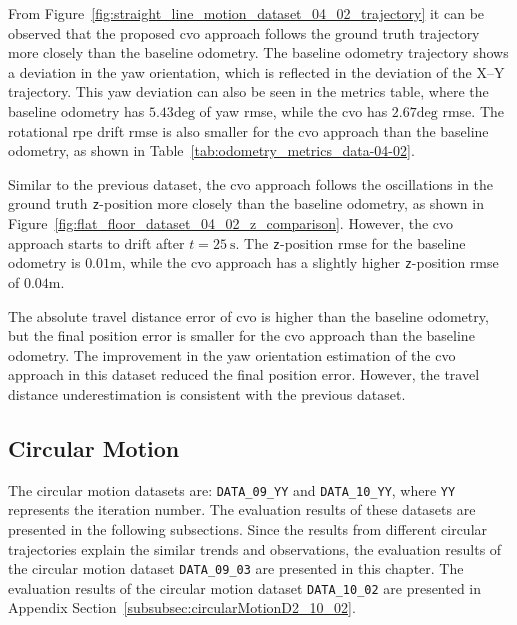 \documentclass[report.tex]{subfiles}
\begin{document}
    From Figure~\ref{fig:straight_line_motion_dataset_04_02_trajectory} it can be observed that the proposed \gls{cvo} approach follows the ground truth trajectory more closely than the baseline odometry. The baseline odometry trajectory shows a deviation in the yaw orientation, which is reflected in the deviation of the X--Y trajectory. This yaw deviation can also be seen in the metrics table, where the baseline odometry has $5.43 \mathrm{deg}$ of yaw \gls{rmse}, while the \gls{cvo} has $2.67 \mathrm{deg}$ \gls{rmse}. The rotational \gls{rpe} drift \gls{rmse} is also smaller for the \gls{cvo} approach than the baseline odometry, as shown in Table~\ref{tab:odometry_metrics_data-04-02}. 
        
    Similar to the previous dataset, the \gls{cvo} approach follows the oscillations in the ground truth \texttt{z}-position more closely than the baseline odometry, as shown in Figure~\ref{fig:flat_floor_dataset_04_02_z_comparison}.  However, the \gls{cvo} approach starts to drift after $t=25~\mathrm{s}$. The \texttt{z}-position \gls{rmse} for the baseline odometry is $0.01 \mathrm{m}$, while the \gls{cvo} approach has a slightly higher \texttt{z}-position \gls{rmse} of $0.04 \mathrm{m}$.
    
    The absolute travel distance error of \gls{cvo} is higher than the baseline odometry, but the final position error is smaller for the \gls{cvo} approach than the baseline odometry. The improvement in the yaw orientation estimation of the \gls{cvo} approach in this dataset reduced the final position error. However, the travel distance underestimation is consistent with the previous dataset.
    \FloatBarrier

    \subsection{Circular Motion}

    The circular motion datasets are: \texttt{DATA\_09\_YY} and \texttt{DATA\_10\_YY}, where \texttt{YY} represents the iteration number. The evaluation results of these datasets are presented in the following subsections. Since the results from different circular trajectories explain the similar trends and observations, the evaluation results of the circular motion dataset \texttt{DATA\_09\_03} are presented in this chapter. The evaluation results of the circular motion dataset \texttt{DATA\_10\_02} are presented in Appendix Section~\ref{subsubsec:circularMotionD2_10_02}.
    
\end{document}
